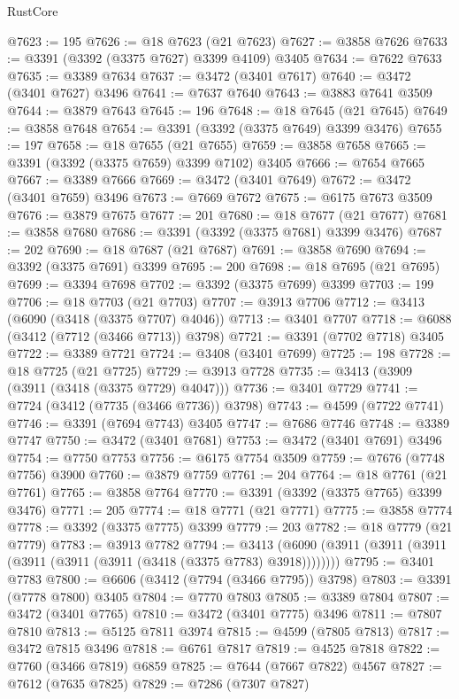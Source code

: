 \begin{lexlean}{RustCore}
\begin{coremodule}
@7623 := 195
@7626 := @18 @7623 (@21 @7623)
@7627 := @3858 @7626
@7633 := @3391 (@3392 (@3375 @7627) @3399 @4109) @3405
@7634 := @7622 @7633
@7635 := @3389 @7634
@7637 := @3472 (@3401 @7617)
@7640 := @3472 (@3401 @7627) @3496
@7641 := @7637 @7640
@7643 := @3883 @7641 @3509
@7644 := @3879 @7643
@7645 := 196
@7648 := @18 @7645 (@21 @7645)
@7649 := @3858 @7648
@7654 := @3391 (@3392 (@3375 @7649) @3399 @3476)
@7655 := 197
@7658 := @18 @7655 (@21 @7655)
@7659 := @3858 @7658
@7665 := @3391 (@3392 (@3375 @7659) @3399 @7102) @3405
@7666 := @7654 @7665
@7667 := @3389 @7666
@7669 := @3472 (@3401 @7649)
@7672 := @3472 (@3401 @7659) @3496
@7673 := @7669 @7672
@7675 := @6175 @7673 @3509
@7676 := @3879 @7675
@7677 := 201
@7680 := @18 @7677 (@21 @7677)
@7681 := @3858 @7680
@7686 := @3391 (@3392 (@3375 @7681) @3399 @3476)
@7687 := 202
@7690 := @18 @7687 (@21 @7687)
@7691 := @3858 @7690
@7694 := @3392 (@3375 @7691) @3399
@7695 := 200
@7698 := @18 @7695 (@21 @7695)
@7699 := @3394 @7698
@7702 := @3392 (@3375 @7699) @3399
@7703 := 199
@7706 := @18 @7703 (@21 @7703)
@7707 := @3913 @7706
@7712 := @3413 (@6090 (@3418 (@3375 @7707) @4046))
@7713 := @3401 @7707
@7718 := @6088 (@3412 (@7712 (@3466 @7713)) @3798)
@7721 := @3391 (@7702 @7718) @3405
@7722 := @3389 @7721
@7724 := @3408 (@3401 @7699)
@7725 := 198
@7728 := @18 @7725 (@21 @7725)
@7729 := @3913 @7728
@7735 := @3413 (@3909 (@3911 (@3418 (@3375 @7729) @4047)))
@7736 := @3401 @7729
@7741 := @7724 (@3412 (@7735 (@3466 @7736)) @3798)
@7743 := @4599 (@7722 @7741)
@7746 := @3391 (@7694 @7743) @3405
@7747 := @7686 @7746
@7748 := @3389 @7747
@7750 := @3472 (@3401 @7681)
@7753 := @3472 (@3401 @7691) @3496
@7754 := @7750 @7753
@7756 := @6175 @7754 @3509
@7759 := @7676 (@7748 @7756) @3900
@7760 := @3879 @7759
@7761 := 204
@7764 := @18 @7761 (@21 @7761)
@7765 := @3858 @7764
@7770 := @3391 (@3392 (@3375 @7765) @3399 @3476)
@7771 := 205
@7774 := @18 @7771 (@21 @7771)
@7775 := @3858 @7774
@7778 := @3392 (@3375 @7775) @3399
@7779 := 203
@7782 := @18 @7779 (@21 @7779)
@7783 := @3913 @7782
@7794 := @3413 (@6090 (@3911 (@3911 (@3911 (@3911 (@3911 (@3911 (@3418 (@3375 @7783) @3918))))))))
@7795 := @3401 @7783
@7800 := @6606 (@3412 (@7794 (@3466 @7795)) @3798)
@7803 := @3391 (@7778 @7800) @3405
@7804 := @7770 @7803
@7805 := @3389 @7804
@7807 := @3472 (@3401 @7765)
@7810 := @3472 (@3401 @7775) @3496
@7811 := @7807 @7810
@7813 := @5125 @7811 @3974
@7815 := @4599 (@7805 @7813)
@7817 := @3472 @7815 @3496
@7818 := @6761 @7817
@7819 := @4525 @7818
@7822 := @7760 (@3466 @7819) @6859
@7825 := @7644 (@7667 @7822) @4567
@7827 := @7612 (@7635 @7825)
@7829 := @7286 (@7307 @7827)

\end{coremodule}
\end{lexlean}
